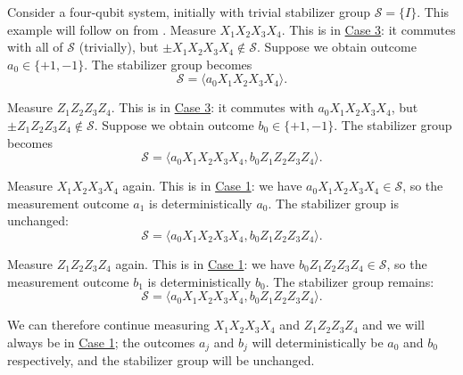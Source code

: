 \begin{example}\label{ex:422_stabilizer_group_updates}
    Consider a four-qubit system, initially with trivial stabilizer group $\mathcal{S} = \{I\}$.
    This example will follow on from .
    Measure $X_1 X_2 X_3 X_4$.
    This is in \hyperref[thm:stabilizer_group_update_measurement:case3]{Case 3}: it commutes with all of $\mathcal{S}$ (trivially), but $\pm X_1 X_2 X_3 X_4 \notin \mathcal{S}$.
    Suppose we obtain outcome $a_0 \in \{+1, -1\}$.
    The stabilizer group becomes
    \begin{equation}
        \mathcal{S} = \langle a_0 X_1 X_2 X_3 X_4 \rangle.
    \end{equation}

    Measure $Z_1 Z_2 Z_3 Z_4$.
    This is in \hyperref[thm:stabilizer_group_update_measurement:case3]{Case 3}: it commutes with $a_0 X_1 X_2 X_3 X_4$, but $\pm Z_1 Z_2 Z_3 Z_4 \notin \mathcal{S}$.
    Suppose we obtain outcome $b_0 \in \{+1, -1\}$.
    The stabilizer group becomes
    \begin{equation}
        \mathcal{S} = \langle a_0 X_1 X_2 X_3 X_4, b_0 Z_1 Z_2 Z_3 Z_4 \rangle.
    \end{equation}

    Measure $X_1 X_2 X_3 X_4$ again.
    This is in \hyperref[thm:stabilizer_group_update_measurement:case1]{Case 1}: we have $a_0 X_1 X_2 X_3 X_4 \in \mathcal{S}$, so the measurement outcome $a_1$ is deterministically $a_0$.
    The stabilizer group is unchanged:
    \begin{equation}
        \mathcal{S} = \langle a_0 X_1 X_2 X_3 X_4, b_0 Z_1 Z_2 Z_3 Z_4 \rangle.
    \end{equation}

    Measure $Z_1 Z_2 Z_3 Z_4$ again.
    This is in \hyperref[thm:stabilizer_group_update_measurement:case1]{Case 1}: we have $b_0 Z_1 Z_2 Z_3 Z_4 \in \mathcal{S}$, so the measurement outcome $b_1$ is deterministically $b_0$.
    The stabilizer group remains:
    \begin{equation}
        \mathcal{S} = \langle a_0 X_1 X_2 X_3 X_4, b_0 Z_1 Z_2 Z_3 Z_4 \rangle.
    \end{equation}

    We can therefore continue measuring $X_1 X_2 X_3 X_4$ and $Z_1 Z_2 Z_3 Z_4$ and we will always be in \hyperref[thm:stabilizer_group_update_measurement:case1]{Case 1}; the outcomes $a_j$ and $b_j$ will deterministically be $a_0$ and $b_0$ respectively, and the stabilizer group will be unchanged.
\end{example}


